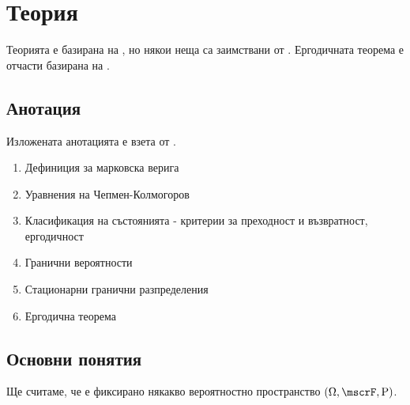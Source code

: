 \documentclass{../../common/topic}
\begin{document}
\maketitle

\section{Теория}

Теорията е базирана на \cite{Божкова2012Лекции}, но някои неща са заимствани от \cite{Боровков1999Вероятности}. Ергодичната теорема е отчасти базирана на \cite{Halidias2017}.

\subsection{Анотация}

Изложената анотацията е взета от \cite{Syllabus}.

\begin{enumerate}
  \item Дефиниция за марковска верига
  \item Уравнения на Чепмен-Колмогоров
  \item Класификация на състоянията - критерии за преходност и възвратност, ергодичност
  \item Гранични вероятности
  \item Стационарни гранични разпределения
  \item Ергодична теорема
\end{enumerate}

\subsection{Основни понятия}

Ще считаме, че е фиксирано някакво вероятностно пространство \( (\Omega, \mscrF, \Prob) \).
\end{document}
